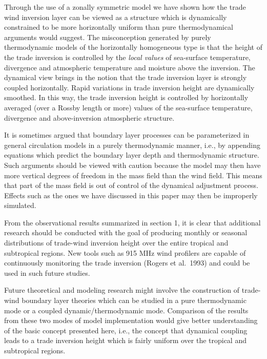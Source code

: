      Through the use of a zonally symmetric model we have shown how the trade
wind inversion layer can be viewed as a structure which is dynamically
constrained to be more horizontally uniform than pure thermodynamical
arguments would suggest.  The misconception generated by purely thermodynamic
models of the horizontally homogeneous type is that the height of the trade
inversion is controlled by the {\it local values} of sea-surface temperature,
divergence and atmospheric temperature and moisture above the inversion.  The
dynamical view brings in the notion that the trade inversion layer is strongly
coupled horizontally.  Rapid variations in trade inversion height are
dynamically smoothed.  In this way, the trade inversion height is controlled
by horizontally averaged (over a Rossby length or more) values of the
sea-surface temperature, divergence and above-inversion atmospheric structure.

     It is sometimes argued that boundary layer processes can be parameterized
in general circulation models in a purely thermodynamic manner, i.e., by
appending equations which predict the boundary layer depth and thermodynamic
structure.  Such arguments should be viewed with caution because the model may
then have more vertical degrees of freedom in the mass field than the wind
field.  This means that part of the mass field is out of control of the
dynamical adjustment process.  Effects such as the ones we have discussed in
this paper may then be improperly simulated.

     From the observational results summarized in section 1, it is clear that
additional research should be conducted with the goal of producing monthly or
seasonal distributions of trade-wind inversion height over the entire tropical
and subtropical regions.  New tools such as 915 MHz wind profilers are capable
of continuously monitoring the trade inversion (Rogers et al.~1993) and could
be used in such future studies.

     Future theoretical and modeling research might involve the construction
of trade-wind boundary layer theories which can be studied in a pure
thermodynamic mode or a coupled dynamic/ther\-mo\-dy\-nam\-ic mode. 
Comparison of the results from these two modes of model implementation would
give better understanding of the basic concept presented here, i.e., the
concept that dynamical coupling leads to a trade inversion height which is
fairly uniform over the tropical and subtropical regions.



